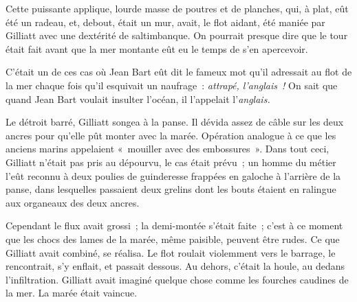 \documentclass[french,twoside]{book} %
\begin{document}
Cette puissante applique, lourde masse de poutres et de planches, qui, à plat, eût été un radeau, et, debout, était un mur, avait, le flot aidant, été maniée par Gilliatt avec une dextérité de saltimbanque. On pourrait presque dire que le tour était fait avant que la mer montante eût eu le temps de s’en apercevoir.\par
C’était un de ces cas où Jean Bart eût dit le fameux mot qu’il adressait au flot de la mer chaque fois qu’il esquivait un naufrage : \emph{attrapé, l’anglais !} On sait que quand Jean Bart voulait insulter l’océan, il l’appelait l’\emph{anglais.}\par
Le détroit barré, Gilliatt songea à la panse. Il dévida assez de câble sur les deux ancres pour qu’elle pût monter avec la marée. Opération analogue à ce que  les anciens marins appelaient « mouiller avec des embossures ». Dans tout ceci, Gilliatt n’était pas pris au dépourvu, le cas était prévu ; un homme du métier l’eût reconnu à deux poulies de guinderesse frappées en galoche à l’arrière de la panse, dans lesquelles passaient deux grelins dont les bouts étaient en ralingue aux organeaux des deux ancres.\par
Cependant le flux avait grossi ; la demi-montée s’était faite ; c’est à ce moment que les chocs des lames de la marée, même paisible, peuvent être rudes. Ce que Gilliatt avait combiné, se réalisa. Le flot roulait violemment vers le barrage, le rencontrait, s’y enflait, et passait dessous. Au dehors, c’était la houle, au dedans l’infiltration. Gilliatt avait imaginé quelque chose comme les fourches caudines de la mer. La marée était vaincue.
\end{document}
